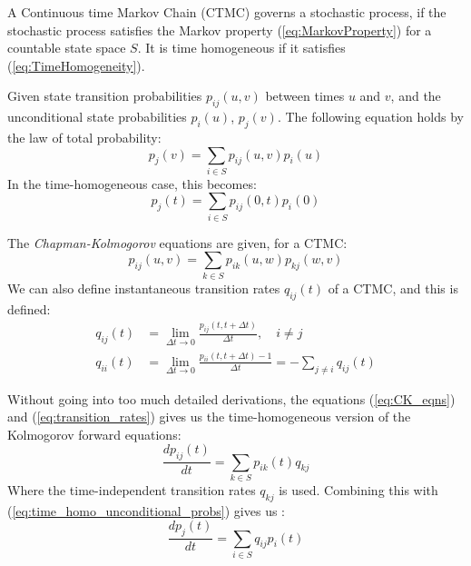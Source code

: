 \begin{definition}
    A Continuous time Markov Chain (CTMC) governs a stochastic process, if the stochastic process satisfies the Markov property (\ref{eq:MarkovProperty}) for a countable state space \(S\). It is time homogeneous if it satisfies (\ref{eq:TimeHomogeneity}). 
\end{definition}
Given state transition probabilities \(p_{ij}(u,v)\) between times \(u\) and \(v\), and the unconditional state probabilities \(p_i(u)\), \(p_j(v)\). The following equation holds by the law of total probability:
\begin{equation}
    p_j(v) = \sum_{i \in S} p_{ij}(u,v) p_i(u)
\end{equation}
In the time-homogeneous case, this becomes:
\begin{equation}\label{eq:time_homo_unconditional_probs}
    p_j(t) = \sum_{i \in S} p_{ij}(0,t) p_i(0)
\end{equation}

The \textit{Chapman-Kolmogorov} equations are given, for a CTMC:
\begin{equation}\label{eq:CK_eqns}
    p_{ij}(u,v) = \sum_{k \in S} p_{ik}(u,w)p_{kj}(w,v)
\end{equation}
We can also define instantaneous transition rates \(q_{ij}(t)\) of a CTMC, and this is defined:
\begin{equation}\label{eq:transition_rates}
\begin{split}
    q_{ij}(t) & = \lim_{\Delta t \rightarrow 0} \frac{p_{ij}(t,t + \Delta t)}{\Delta t}, \quad i \neq j \\
    q_{ii}(t) & = \lim_{\Delta t \rightarrow 0} \frac{p_{ii}(t,t + \Delta t) - 1}{\Delta t} = -\sum_{j \neq i} q_{ij}(t)
\end{split}
\end{equation}

Without going into too much detailed derivations, the equations (\ref{eq:CK_eqns}) and (\ref{eq:transition_rates}) gives us the time-homogeneous version of the Kolmogorov forward equations:
\begin{equation}
    \frac{d p_{ij}(t)}{dt}  = \sum_{k \in S} p_{ik}(t)q_{kj}
\end{equation}
Where the time-independent transition rates \(q_{kj}\) is used. Combining this with (\ref{eq:time_homo_unconditional_probs}) gives us :
\begin{equation}
    \frac{d p_j (t)}{dt} = \sum_{i \in S} q_{ij} p_i(t)
\end{equation}

